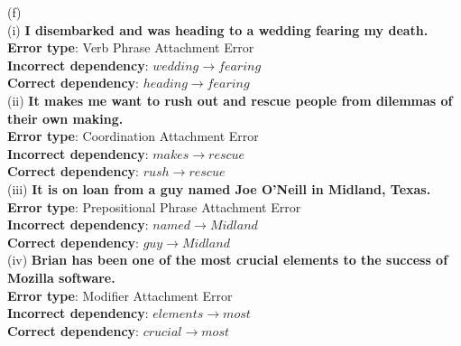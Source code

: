 \documentclass{article}
\begin{document}
(f) \\
(i) \textbf{I disembarked and was heading to a wedding fearing my death.}\\
\textbf{Error type}: Verb Phrase Attachment Error\\
\textbf{Incorrect dependency}: $wedding \rightarrow fearing$\\
\textbf{Correct dependency}: $heading \rightarrow fearing$\\
(ii) \textbf{It makes me want to rush out and rescue people from dilemmas of their own making.}\\
\textbf{Error type}: Coordination Attachment Error\\
\textbf{Incorrect dependency}: $makes \rightarrow rescue$\\
\textbf{Correct dependency}: $rush \rightarrow rescue$\\
(iii) \textbf{It is on loan from a guy named Joe O'Neill in Midland, Texas.}\\
\textbf{Error type}: Prepositional Phrase Attachment Error\\
\textbf{Incorrect dependency}: $named \rightarrow Midland$\\
\textbf{Correct dependency}: $guy \rightarrow Midland$\\
(iv) \textbf{Brian has been one of the most crucial elements to the success of Mozilla software.}\\
\textbf{Error type}: Modifier Attachment Error\\
\textbf{Incorrect dependency}: $elements \rightarrow most$\\
\textbf{Correct dependency}: $crucial \rightarrow most$\\

\end{document}
